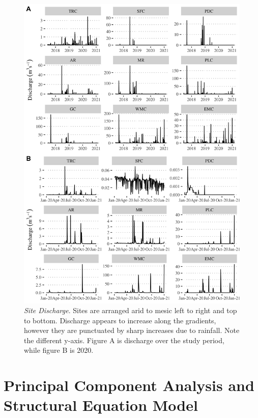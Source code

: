 \begin{figure}[htb]
\begin{center}
\includegraphics[scale = 0.21]{Figs/Q2020.png}
\caption[Site Discharge]{\textit{Site Discharge}. Sites are arranged arid to mesic left to right and top to bottom. Discharge appears to increase along the gradients, however they are punctuated by sharp increases due to rainfall. Note the different y-axis. Figure A is discharge over the study period, while figure B is 2020.}
\label{Fig:Q}
\end{center}
\end{figure}



\section{Principal Component Analysis and Structural Equation Model}

